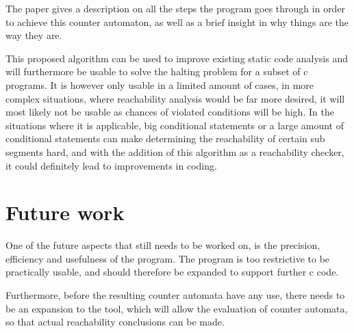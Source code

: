\documentclass[12pt]{article}
\begin{document}
The paper gives a description on all the steps the program goes through in order to achieve this counter automaton, as well as a brief insight in why things are the way they are.

This proposed algorithm can be used to improve existing static code analysis and will furthermore be usable to solve the halting problem for a subset of c programs. It is however only usable in a limited amount of cases, in more complex situations, where reachability analysis would be far more desired, it will most likely not be usable as chances of violated conditions will be high. In the situations where it is applicable, big conditional statements or a large amount of conditional statements can make determining the reachability of certain sub segments hard, and with the addition of this algorithm as a reachability checker, it could definitely lead to improvements in coding.

\section{Future work}
One of the future aspects that still needs to be worked on, is the precision, efficiency and usefulness of the program. The program is too restrictive to be practically usable, and should therefore be expanded to support further c code.

Furthermore, before the resulting counter automata have any use, there needs to be an expansion to the tool, which will allow the evaluation of counter automata, so that actual reachability conclusions can be made.
\printbibliography
\end{document}
